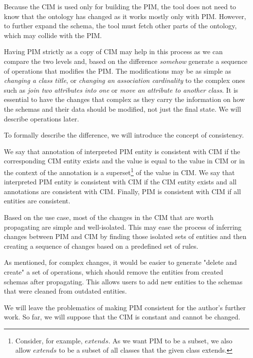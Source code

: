 Because the CIM is used only for building the PIM, the tool does not need to know that the ontology has changed as it works mostly only with PIM. However, to further expand the schema, the tool must fetch other parts of the ontology, which may collide with the PIM.

Having PIM strictly as a copy of CIM may help in this process as we can compare the two levels and, based on the difference \textit{somehow} generate a sequence of operations that modifies the PIM. The modifications may be as simple as \textit{changing a class title}, or \textit{changing an association cardinality} to the complex ones such as \textit{join two attributes into one} or \textit{move an attribute to another class}. It is essential to have the changes that complex as they carry the information on how the schemas and their data should be modified, not just the final state. We will describe operations later.

To formally describe the difference, we will introduce the concept of consistency.

\begin{definition}[consistency]
    We say that {annotation of interpreted PIM entity is consistent with CIM} if the corresponding CIM entity exists and the value is equal to the value in CIM or in the context of the annotation is a superset\footnote{Consider, for example, $extends$. As we want PIM to be a subset, we also allow $extends$ to be a subset of all classes that the given class extends.} of the value in CIM. We say that {interpreted PIM entity is consistent with CIM} if the CIM entity exists and all annotations are consistent with CIM. Finally, {PIM is consistent with CIM} if all entities are consistent.
\end{definition}

Based on the use case, most of the changes in the CIM that are worth propagating are simple and well-isolated. This may ease the process of inferring changes between PIM and CIM by finding those isolated sets of entities and then creating a sequence of changes based on a predefined set of rules.

As mentioned, for complex changes, it would be easier to generate "delete and create" a set of operations, which should remove the entities from created schemas after propagating. This allows users to add new entities to the schemas that were cleaned from outdated entities.

\medskip

We will leave the problematics of making PIM consistent for the author's further work. So far, we will suppose that the CIM is constant and cannot be changed.


